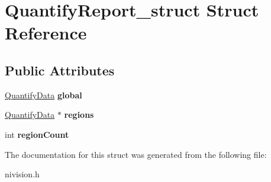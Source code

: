 \hypertarget{structQuantifyReport__struct}{
\section{QuantifyReport\_\-struct Struct Reference}
\label{structQuantifyReport__struct}
}
\subsection*{Public Attributes}
\begin{DoxyCompactItemize}
\item 
\hypertarget{structQuantifyReport__struct_ab9a92e5884d9b26def7c84a786bdfd84}{
\hyperlink{structQuantifyData__struct}{QuantifyData} {\bfseries global}}
\label{structQuantifyReport__struct_ab9a92e5884d9b26def7c84a786bdfd84}

\item 
\hypertarget{structQuantifyReport__struct_ac86450925ec96656fc37505ed8e6c43d}{
\hyperlink{structQuantifyData__struct}{QuantifyData} $\ast$ {\bfseries regions}}
\label{structQuantifyReport__struct_ac86450925ec96656fc37505ed8e6c43d}

\item 
\hypertarget{structQuantifyReport__struct_acf460a0a03c8728fa78ed9f21ff801e7}{
int {\bfseries regionCount}}
\label{structQuantifyReport__struct_acf460a0a03c8728fa78ed9f21ff801e7}

\end{DoxyCompactItemize}


The documentation for this struct was generated from the following file:\begin{DoxyCompactItemize}
\item 
nivision.h\end{DoxyCompactItemize}
